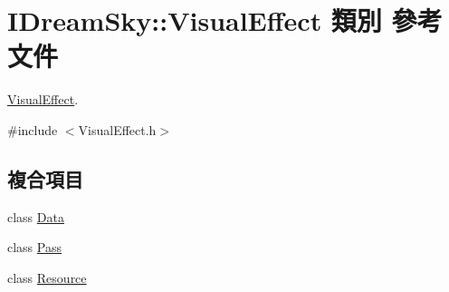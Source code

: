 \hypertarget{class_i_dream_sky_1_1_visual_effect}{}\section{I\+Dream\+Sky\+:\+:Visual\+Effect 類別 參考文件}
\label{class_i_dream_sky_1_1_visual_effect}


\hyperlink{class_i_dream_sky_1_1_visual_effect}{Visual\+Effect}.  




{\ttfamily \#include $<$Visual\+Effect.\+h$>$}

\subsection*{複合項目}
\begin{DoxyCompactItemize}
\item 
class \hyperlink{class_i_dream_sky_1_1_visual_effect_1_1_data}{Data}
\item 
class \hyperlink{class_i_dream_sky_1_1_visual_effect_1_1_pass}{Pass}
\item 
class \hyperlink{class_i_dream_sky_1_1_visual_effect_1_1_resource}{Resource}
\end{DoxyCompactItemize}
